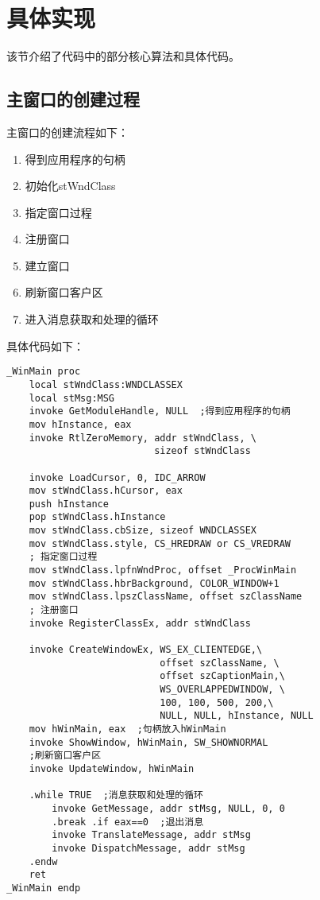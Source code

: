 \section{具体实现}
该节介绍了代码中的部分核心算法和具体代码。

\subsection{主窗口的创建过程}
主窗口的创建流程如下：
\begin{enumerate}
    \item 得到应用程序的句柄
    \item 初始化stWndClass
    \item 指定窗口过程
    \item 注册窗口
    \item 建立窗口
    \item 刷新窗口客户区
    \item 进入消息获取和处理的循环
\end{enumerate}

具体代码如下：
\begin{lstlisting}
_WinMain proc  
    local stWndClass:WNDCLASSEX 
    local stMsg:MSG
    invoke GetModuleHandle, NULL  ;得到应用程序的句柄
    mov hInstance, eax
    invoke RtlZeroMemory, addr stWndClass, \
                          sizeof stWndClass

    invoke LoadCursor, 0, IDC_ARROW
    mov stWndClass.hCursor, eax
    push hInstance
    pop stWndClass.hInstance
    mov stWndClass.cbSize, sizeof WNDCLASSEX
    mov stWndClass.style, CS_HREDRAW or CS_VREDRAW
    ; 指定窗口过程
    mov stWndClass.lpfnWndProc, offset _ProcWinMain
    mov stWndClass.hbrBackground, COLOR_WINDOW+1
    mov stWndClass.lpszClassName, offset szClassName
    ; 注册窗口
    invoke RegisterClassEx, addr stWndClass

    invoke CreateWindowEx, WS_EX_CLIENTEDGE,\
                           offset szClassName, \
                           offset szCaptionMain,\  
                           WS_OVERLAPPEDWINDOW, \
                           100, 100, 500, 200,\
                           NULL, NULL, hInstance, NULL
    mov hWinMain, eax  ;句柄放入hWinMain
    invoke ShowWindow, hWinMain, SW_SHOWNORMAL  
    ;刷新窗口客户区
    invoke UpdateWindow, hWinMain  

    .while TRUE  ;消息获取和处理的循环
        invoke GetMessage, addr stMsg, NULL, 0, 0
        .break .if eax==0  ;退出消息
        invoke TranslateMessage, addr stMsg  
        invoke DispatchMessage, addr stMsg
    .endw
    ret
_WinMain endp

\end{lstlisting}

